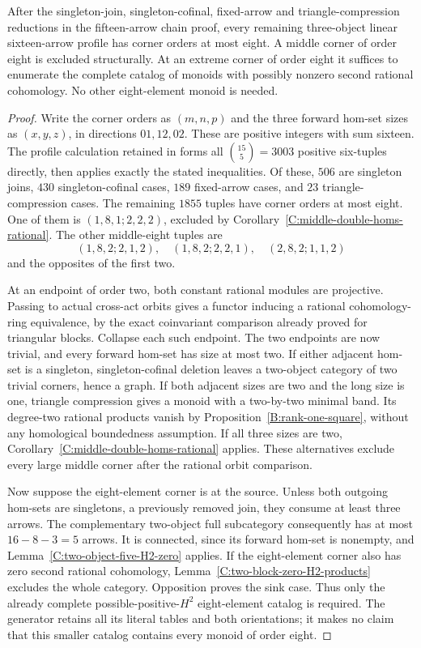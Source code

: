 \begin{proposition}
\label{C:sixteen-linear-large-corners}
After the singleton-join, singleton-cofinal, fixed-arrow and
triangle-compression reductions in the fifteen-arrow chain
proof, every remaining three-object linear sixteen-arrow
profile has corner orders at most eight.  A middle corner of
order eight is excluded structurally.  At an extreme corner
of order eight it suffices to enumerate the complete catalog
of monoids with possibly nonzero second rational cohomology.
No other eight-element monoid is needed.
\end{proposition}
\begin{proof}
Write the corner orders as $(m,n,p)$ and the three forward
hom-set sizes as $(x,y,z)$, in directions $01,12,02$.
These are positive integers with sum sixteen.  The profile
calculation retained in
forms all $\binom{15}{5}=3003$ positive six-tuples directly,
then applies exactly the stated inequalities.  Of these,
$506$ are singleton joins, $430$ singleton-cofinal cases,
$189$ fixed-arrow cases, and $23$ triangle-compression cases.
The remaining $1855$ tuples have corner orders at most eight.
One of them is $(1,8,1;2,2,2)$, excluded by
Corollary~\ref{C:middle-double-homs-rational}.
The other middle-eight tuples are
\[
 (1,8,2;2,1,2),\quad (1,8,2;2,2,1),\quad
 (2,8,2;1,1,2)
\]
and the opposites of the first two.

At an endpoint of order two, both constant rational modules
are projective.  Passing to actual cross-act orbits gives
a functor inducing a rational cohomology-ring equivalence,
by the exact coinvariant comparison already proved for
triangular blocks.  Collapse each such endpoint.  The two
endpoints are now trivial, and every forward hom-set has
size at most two.  If either adjacent hom-set is a singleton,
singleton-cofinal deletion leaves a two-object category of
two trivial corners, hence a graph.  If both adjacent sizes
are two and the long size is one, triangle compression gives
a monoid with a two-by-two minimal band.  Its degree-two
rational products vanish by Proposition~\ref{B:rank-one-square}, without
any homological boundedness assumption.  If all three sizes
are two, Corollary~\ref{C:middle-double-homs-rational} applies.
These alternatives exclude every large middle corner after
the rational orbit comparison.

Now suppose the eight-element corner is at the source.
Unless both outgoing hom-sets are singletons, a previously
removed join, they consume at least three arrows.  The
complementary two-object full subcategory consequently has
at most $16-8-3=5$ arrows.  It is connected, since its forward
hom-set is nonempty, and Lemma~\ref{C:two-object-five-H2-zero}
applies.  If the eight-element corner also has zero second
rational cohomology, Lemma~\ref{C:two-block-zero-H2-products}
excludes the whole category.  Opposition proves the sink case.
Thus only the already complete possible-positive-$H^2$
eight-element catalog is required.  The generator retains
all its literal tables and both orientations; it makes no
claim that this smaller catalog contains every monoid of
order eight.
\end{proof}

